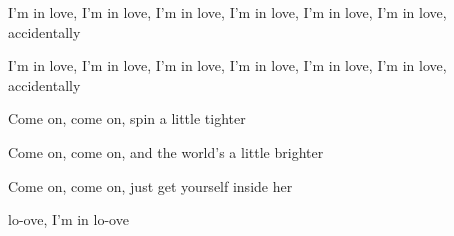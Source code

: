 \begin{song}
\bigskip

 I'm in love, I'm in love, I'm in love, I'm in love, I'm in love, I'm in love, accidentally \par
{} I'm in love, I'm in love, I'm in love, I'm in love, I'm in love, I'm in love, accidentally \par

\bigskip

Come on, come on, spin a little tighter \par
{}Come on, come on, and the world's a little brighter \par
{}Come on, come on, just get yourself inside her \par
{}lo-ove, I'm in lo-ove \par

\end{song}
